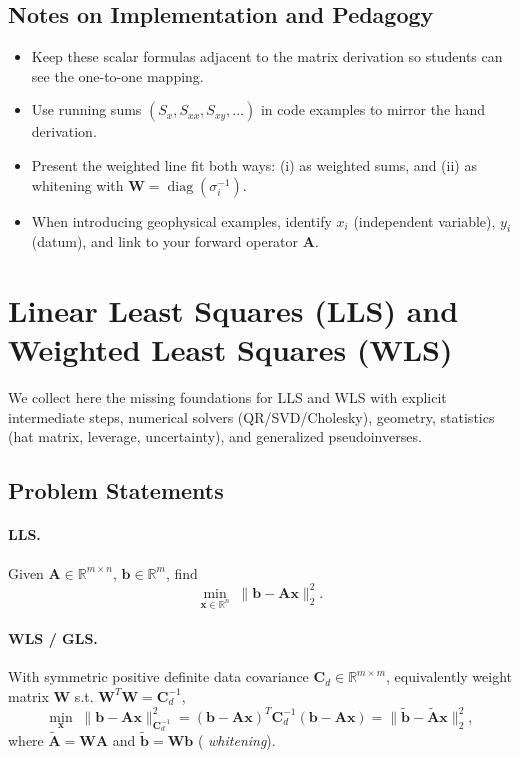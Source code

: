 \documentclass[11pt,a4paper]{article}
\begin{document}
\subsection{Notes on Implementation and Pedagogy}
\begin{itemize}
  \item Keep these scalar formulas adjacent to the matrix derivation so students can see the one-to-one mapping.
  \item Use running sums $(S_x,S_{xx},S_{xy},\dots)$ in code examples to mirror the hand derivation.
  \item Present the weighted line fit both ways: (i) as weighted sums, and (ii) as whitening with $\mathbf{W}=\operatorname{diag}(\sigma_i^{-1})$.
  \item When introducing geophysical examples, identify $x_i$ (independent variable), $y_i$ (datum), and link to your forward operator $\mathbf{A}$.
\end{itemize}



\section{Linear Least Squares (LLS) and Weighted Least Squares (WLS)}\label{sec:lls-wls}

We collect here the missing foundations for LLS and WLS with explicit intermediate steps, numerical solvers (QR/SVD/Cholesky), geometry, statistics (hat matrix, leverage, uncertainty), and generalized pseudoinverses.

\subsection{Problem Statements}
\paragraph{LLS.} Given $\mathbf{A}\in\mathbb{R}^{m\times n}$, $\mathbf{b}\in\mathbb{R}^m$, find
\[
\min_{\mathbf{x}\in\mathbb{R}^n} \; \|\mathbf{b}-\mathbf{A}\mathbf{x}\|_2^2.
\]
\paragraph{WLS / GLS.} With symmetric positive definite data covariance $\mathbf{C}_d\in\mathbb{R}^{m\times m}$, equivalently weight matrix $\mathbf{W}$ s.t. $\mathbf{W}^T\mathbf{W}=\mathbf{C}_d^{-1}$,
\[
\min_{\mathbf{x}} \; \|\mathbf{b}-\mathbf{A}\mathbf{x}\|_{\mathbf{C}_d^{-1}}^2
= (\mathbf{b}-\mathbf{A}\mathbf{x})^T\mathbf{C}_d^{-1}(\mathbf{b}-\mathbf{A}\mathbf{x})
= \|\tilde{\mathbf{b}}-\tilde{\mathbf{A}}\mathbf{x}\|_2^2,
\]
where $\tilde{\mathbf{A}}=\mathbf{W}\mathbf{A}$ and $\tilde{\mathbf{b}}=\mathbf{W}\mathbf{b}$ (
\emph{whitening}).
\end{document}
